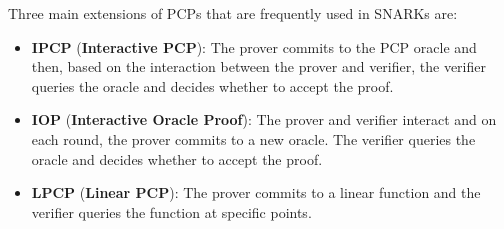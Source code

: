 \documentclass{zkdl-presentation-template}
\begin{document}
    \begin{frame}
        Three main extensions of PCPs that are frequently used in SNARKs are:
        \begin{itemize}
            \item \textbf{IPCP} (\textbf{Interactive PCP}): The prover commits to the PCP oracle and then, based on the interaction between the prover and verifier, the verifier queries the oracle and decides whether to accept the proof.
            \item \textbf{IOP} (\textbf{Interactive Oracle Proof}): The prover and verifier interact and on each round, the prover commits to a new oracle. The verifier queries the oracle and decides whether to accept the proof.
            \item \textbf{LPCP} (\textbf{Linear PCP}): The prover commits to a linear function and the verifier queries the function at specific points.
        \end{itemize}
    \end{frame}
\end{document}
